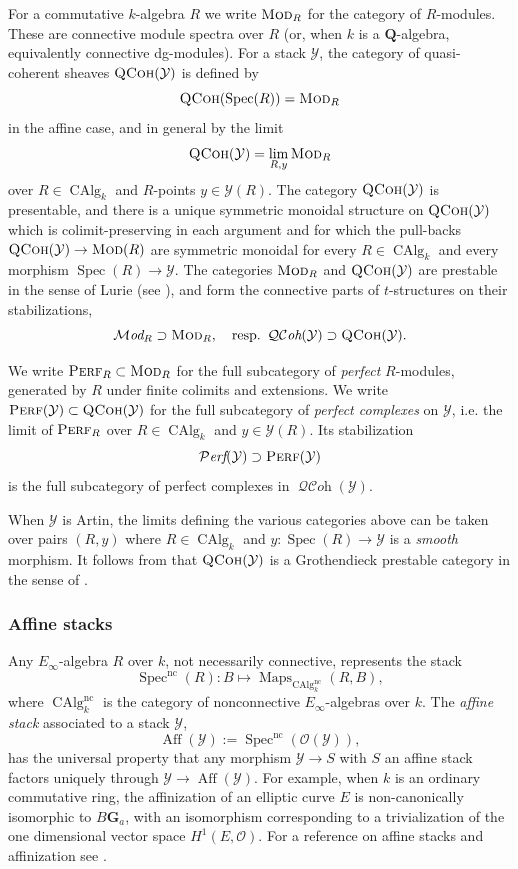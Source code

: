 \documentclass[12pt, oneside]{amsart}
\numberwithin{equation}{section}
\theoremstyle{remark}
\theoremstyle{plain}
\newcommand{\Mod}{\textsc{Mod}}
\newcommand{\MOD}{\mathcal{M}\textit{od}}
\DeclareMathOperator{\QCoh}{\textsc{QCoh}}
\DeclareMathOperator{\QCOH}{\mathcal{QC}\textit{oh}}
\DeclareMathOperator{\Perf}{\textsc{Perf}}
\DeclareMathOperator{\PERF}{\mathcal{P}\textit{erf}}
\DeclareMathOperator{\Map}{Maps}
\newcommand{\OO}{\mathcal{O}}
\newcommand{\YY}{\mathcal{Y}}
\DeclareMathOperator{\spc}{Spec}
\newcommand{\Specnc}{\operatorname{Spec}^{\mathrm{nc}}}
\newcommand{\GGa}{\mathbf{G}_{a}}
\newcommand{\dAlgk}{\operatorname{CAlg}_{k}}
\begin{document}
For a commutative $k$-algebra $R$ we write $\Mod_R$ for the category of $R$-modules.
These are connective module spectra over $R$ (or, when $k$ is a $\mathbf{Q}$-algebra, equivalently connective dg-modules). For a stack $\YY$, the category of quasi-coherent sheaves $\QCoh(\YY)$ is defined by $$\QCoh(\spc(R)) = \Mod_R$$ in the affine case, and in general by the limit \[\QCoh(\YY) = \lim_{R,y} \Mod_R \] over $R\in\dAlgk$ and $R$-points $y \in \YY(R)$. The category $\QCoh(\YY)$ is presentable, and there is a unique symmetric monoidal structure on $\QCoh(\YY)$ which is colimit-preserving in each argument and for which the pull-backs $\QCoh(\YY) \to \Mod(R)$ are symmetric monoidal for every $R\in\dAlgk$ and every morphism $\spc(R) \to \YY$.
The categories $\Mod_R$ and $\QCoh(\YY)$ are prestable in the sense of Lurie (see \cite[App.~C]{SAG}), and form the connective parts of $t$-structures on their stabilizations,
$$ \MOD_R \supset \Mod_R, \quad \text{resp.}\ \QCOH(\YY) \supset \QCoh(\YY). $$

We write $\Perf_R \subset \Mod_R$ for the full subcategory of \emph{perfect} $R$-modules, generated by $R$ under finite colimits and extensions. We write $\Perf(\YY) \subset \QCoh(\YY)$ for the full subcategory of \emph{perfect complexes} on $\YY$, i.e. the limit of $\Perf_R$ over $R\in\dAlgk$ and $y \in \YY(R)$. Its stabilization $$\PERF(\YY) \supset \Perf(\YY)$$ is the full subcategory of perfect complexes in $\QCOH(\YY)$.

When $\YY$ is Artin, the limits defining the various categories above can be taken over pairs $(R,y)$ where $R\in\dAlgk$ and $y : \spc(R) \to \YY$ is a \emph{smooth} morphism. It follows from \cite[Prop.~C.3.2.4]{SAG} that $\QCoh(\YY)$ is a Grothendieck prestable category in the sense of \cite[\S C.1.4]{SAG}.

\subsubsection{Affine stacks}

Any $E_\infty$-algebra $R$ over $k$, not necessarily connective, represents the stack
$$\Specnc(R) : B \mapsto \Map_{\dAlgk^{\mathrm{nc}}}(R, B),$$ where $\dAlgk^{\mathrm{nc}}$ is the category of nonconnective $E_\infty$-algebras over $k$.
The \emph{affine stack} associated to a stack $\YY$,
$$ \operatorname{Aff}(\YY) := \Specnc(\OO(\YY)), $$
has the universal property that any morphism $\YY\rightarrow S$ with $S$ an affine stack factors uniquely through $\YY \to \operatorname{Aff}(\YY)$. For example, when $k$ is an ordinary commutative ring, the affinization of an elliptic curve $E$ is non-canonically isomorphic to $B\GGa$, with an isomorphism corresponding to a trivialization of the one dimensional vector space $H^{1}(E,\mathcal{O})$. For a reference on affine stacks and affinization see \cite[\S 3]{BNloop}.
\end{document}
